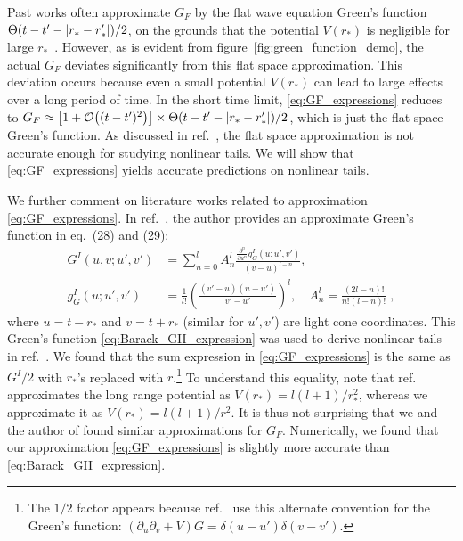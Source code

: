\documentclass[reprint,aps,physrev,superscriptaddress,10pt,notitlepage,prd,nofootinbib,onecolumn]{revtex4-2}
\newcommand{\fref}[1]{figure~\ref{#1}}
\begin{document}
Past works often approximate $G_F$ by the flat wave equation Green's function $ \Theta(t-t'-\abs{r_*-r_*'}) / 2$, on the grounds that the potential $V(r_*)$ is negligible for large $r_*$~\cite{Lagos:2022otp,Okuzumi:2008ej}.
However, as is evident from \fref{fig:green_function_demo}, the actual $G_F$ deviates significantly from this flat space approximation.
This deviation occurs because even a small potential $V(r_*)$ can lead to large effects over a long period of time.
In the short time limit, \eqref{eq:GF_expressions} reduces to $G_F \approx \left[1 + \order{(t-t')^2}\right] \times \Theta(t-t'-\abs{r_*-r_*'}) / 2$, which is just the flat space Green's function.
As discussed in ref.~\cite{Cardoso:2024jme}, the flat space approximation is not accurate enough for studying nonlinear tails.
We will show that \eqref{eq:GF_expressions} yields accurate predictions on nonlinear tails.



We further comment on literature works related to approximation \eqref{eq:GF_expressions}.
In ref.~\cite{Barack:1998bw}, the author provides an approximate Green's function in eq.~(28) and (29):
\begin{align}
  \label{eq:Barack_GII_expression}
  G^{I}(u,v; u', v') &= \sum_{n=0}^{l} A_n^l \frac{\frac{\partial^n}{\partial u^n} g_G^{I} (u; u', v')}{(v - u)^{l-n}}, \nonumber \\
  g_G^{I} (u; u', v') &= \frac{1}{l!} \left( \frac{(v' - u)(u - u')}{v' - u'} \right)^l, \quad A_n^l = \frac{(2l - n)!}{n!(l - n)!} \;,
\end{align}
where $u = t - r_*$ and $v = t + r_*$ (similar for $u',v'$) are light cone coordinates.
This Green's function \eqref{eq:Barack_GII_expression} was used to derive nonlinear tails in ref.~\cite{Cardoso:2024jme}.
We found that the sum expression in \eqref{eq:GF_expressions} is the same as $G^{I} / 2$ with $r_*$'s replaced with $r$.\footnote{The $1/2$ factor appears because ref.~\cite{Barack:1998bw} use this alternate convention for the Green's function: $(\partial_u \partial_v + V) G = \delta(u-u') \delta(v-v')$.}
To understand this equality, note that ref.~\cite{Barack:1998bw} approximates the long range potential as $V(r_*) = l(l+1) / r_*^2$, whereas we approximate it as $V(r_*) = l(l+1) / r^2$.
It is thus not surprising that we and the author of \cite{Barack:1998bw} found similar approximations for $G_F$.
Numerically, we found that our approximation \eqref{eq:GF_expressions} is slightly more accurate than \eqref{eq:Barack_GII_expression}.
\end{document}
